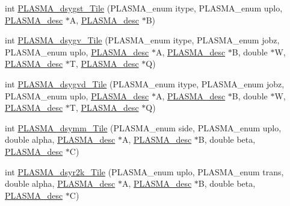 \begin{DoxyCompactItemize}
\item 
int \hyperlink{group__double__Tile_ga3500cf0cf6d6b233f3f1078d5f5057d8_ga3500cf0cf6d6b233f3f1078d5f5057d8}{P\+L\+A\+S\+M\+A\+\_\+dsygst\+\_\+\+Tile} (P\+L\+A\+S\+M\+A\+\_\+enum itype, P\+L\+A\+S\+M\+A\+\_\+enum uplo, \hyperlink{structplasma__desc__t}{P\+L\+A\+S\+M\+A\+\_\+desc} $\ast$A, \hyperlink{structplasma__desc__t}{P\+L\+A\+S\+M\+A\+\_\+desc} $\ast$B)
\item 
int \hyperlink{group__double__Tile_ga4b8b807aca8e84087b88ffdac3d07b8c_ga4b8b807aca8e84087b88ffdac3d07b8c}{P\+L\+A\+S\+M\+A\+\_\+dsygv\+\_\+\+Tile} (P\+L\+A\+S\+M\+A\+\_\+enum itype, P\+L\+A\+S\+M\+A\+\_\+enum jobz, P\+L\+A\+S\+M\+A\+\_\+enum uplo, \hyperlink{structplasma__desc__t}{P\+L\+A\+S\+M\+A\+\_\+desc} $\ast$A, \hyperlink{structplasma__desc__t}{P\+L\+A\+S\+M\+A\+\_\+desc} $\ast$B, double $\ast$W, \hyperlink{structplasma__desc__t}{P\+L\+A\+S\+M\+A\+\_\+desc} $\ast$T, \hyperlink{structplasma__desc__t}{P\+L\+A\+S\+M\+A\+\_\+desc} $\ast$Q)
\item 
int \hyperlink{group__double__Tile_ga051c288d3afc0f7dc21d84c613ea3bac_ga051c288d3afc0f7dc21d84c613ea3bac}{P\+L\+A\+S\+M\+A\+\_\+dsygvd\+\_\+\+Tile} (P\+L\+A\+S\+M\+A\+\_\+enum itype, P\+L\+A\+S\+M\+A\+\_\+enum jobz, P\+L\+A\+S\+M\+A\+\_\+enum uplo, \hyperlink{structplasma__desc__t}{P\+L\+A\+S\+M\+A\+\_\+desc} $\ast$A, \hyperlink{structplasma__desc__t}{P\+L\+A\+S\+M\+A\+\_\+desc} $\ast$B, double $\ast$W, \hyperlink{structplasma__desc__t}{P\+L\+A\+S\+M\+A\+\_\+desc} $\ast$T, \hyperlink{structplasma__desc__t}{P\+L\+A\+S\+M\+A\+\_\+desc} $\ast$Q)
\item 
int \hyperlink{group__double__Tile_gae536f325dde1d788ef2b355a9dca3ca6_gae536f325dde1d788ef2b355a9dca3ca6}{P\+L\+A\+S\+M\+A\+\_\+dsymm\+\_\+\+Tile} (P\+L\+A\+S\+M\+A\+\_\+enum side, P\+L\+A\+S\+M\+A\+\_\+enum uplo, double alpha, \hyperlink{structplasma__desc__t}{P\+L\+A\+S\+M\+A\+\_\+desc} $\ast$A, \hyperlink{structplasma__desc__t}{P\+L\+A\+S\+M\+A\+\_\+desc} $\ast$B, double beta, \hyperlink{structplasma__desc__t}{P\+L\+A\+S\+M\+A\+\_\+desc} $\ast$C)
\item 
int \hyperlink{group__double__Tile_gab0cd0d402590b7da7a74372aa6d5889e_gab0cd0d402590b7da7a74372aa6d5889e}{P\+L\+A\+S\+M\+A\+\_\+dsyr2k\+\_\+\+Tile} (P\+L\+A\+S\+M\+A\+\_\+enum uplo, P\+L\+A\+S\+M\+A\+\_\+enum trans, double alpha, \hyperlink{structplasma__desc__t}{P\+L\+A\+S\+M\+A\+\_\+desc} $\ast$A, \hyperlink{structplasma__desc__t}{P\+L\+A\+S\+M\+A\+\_\+desc} $\ast$B, double beta, \hyperlink{structplasma__desc__t}{P\+L\+A\+S\+M\+A\+\_\+desc} $\ast$C)

\end{DoxyCompactItemize}
